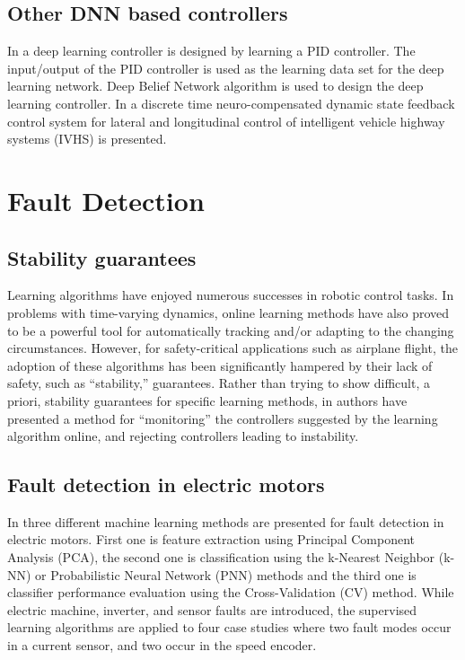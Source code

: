 \documentclass[conference]{IEEEtran}
\begin{document}
\subsection{\textbf{Other DNN based controllers}}

In \cite{aamir13pid} a deep learning controller is designed by learning a PID controller. The input/output of the PID controller is used as the learning data set for the deep learning network. Deep Belief Network algorithm is used to design the deep learning controller. In \cite{kumarawadu2010discrete-time} a discrete time neuro-compensated dynamic state feedback control system for lateral and longitudinal control of intelligent vehicle highway systems (IVHS) is presented.




\section{Fault Detection}

\subsection{\textbf{Stability guarantees}}

Learning algorithms have enjoyed numerous successes in robotic control tasks. In problems with time-varying dynamics, online learning methods have also proved to be a powerful tool for automatically tracking and/or adapting to the changing circumstances. However, for safety-critical applications such as airplane flight, the adoption of these algorithms has been significantly hampered by their lack of safety, such as “stability,” guarantees. Rather than trying to show difficult, a priori, stability guarantees for specific learning methods, in \cite{kim2005nips} authors have presented a method for “monitoring” the controllers suggested by the learning algorithm online, and rejecting controllers leading to instability.

\subsection{\textbf{Fault detection in electric motors}}

In \cite{silva2013fault} three different machine learning methods are presented for fault detection in electric motors. First one is feature extraction using Principal Component Analysis (PCA), the second one is classification using the k-Nearest Neighbor (k-NN) or Probabilistic Neural Network (PNN) methods and the third one is classifier performance evaluation using the Cross-Validation (CV) method. While electric machine, inverter, and sensor faults are introduced, the supervised learning algorithms are applied to four case studies where two fault modes occur in a current sensor, and two occur in the speed encoder.
\end{document}
